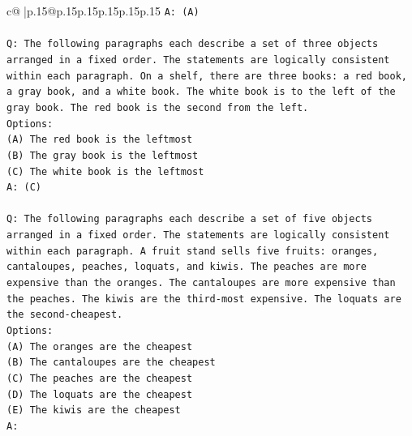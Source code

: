 \documentclass{article}
\begin{document}
{\begin{supertabular}{c@{$\;$}|p{.15\linewidth}@{}p{.15\linewidth}p{.15\linewidth}p{.15\linewidth}p{.15\linewidth}p{.15\linewidth}}
{{{\texttt{A: (A)} \\
\\ 
\texttt{Q: The following paragraphs each describe a set of three objects arranged in a fixed order. The statements are logically consistent within each paragraph. On a shelf, there are three books: a red book, a gray book, and a white book. The white book is to the left of the gray book. The red book is the second from the left.} \\
\texttt{Options:} \\
\texttt{(A) The red book is the leftmost} \\
\texttt{(B) The gray book is the leftmost} \\
\texttt{(C) The white book is the leftmost} \\
\texttt{A: (C)} \\
\\ 
\texttt{Q: The following paragraphs each describe a set of five objects arranged in a fixed order. The statements are logically consistent within each paragraph. A fruit stand sells five fruits: oranges, cantaloupes, peaches, loquats, and kiwis. The peaches are more expensive than the oranges. The cantaloupes are more expensive than the peaches. The kiwis are the third{-}most expensive. The loquats are the second{-}cheapest.} \\
\texttt{Options:} \\
\texttt{(A) The oranges are the cheapest} \\
\texttt{(B) The cantaloupes are the cheapest} \\
\texttt{(C) The peaches are the cheapest} \\
\texttt{(D) The loquats are the cheapest} \\
\texttt{(E) The kiwis are the cheapest} \\
\texttt{A:} \\
            }
        }
    }
     \\ \\


\end{supertabular}}
\end{document}
